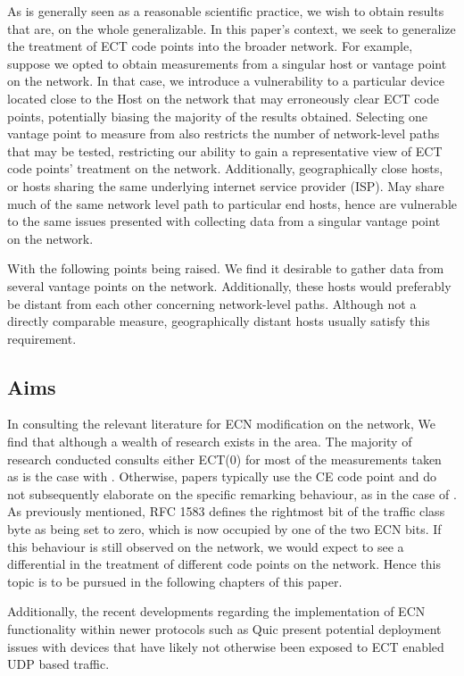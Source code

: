 \documentclass{l4proj}
\begin{document}
As is generally seen as a reasonable scientific practice, we wish to obtain results that are, on the whole generalizable. In this paper's context, we seek to generalize the treatment of ECT code points into the broader network. For example, suppose we opted to obtain measurements from a singular host or vantage point on the network. In that case, we introduce a vulnerability to a particular device located close to the Host on the network that may erroneously clear ECT code points, potentially biasing the majority of the results obtained. Selecting one vantage point to measure from also restricts the number of network-level paths that may be tested, restricting our ability to gain a representative view of ECT code points' treatment on the network. Additionally, geographically close hosts, or hosts sharing the same underlying internet service provider (ISP). May share much of the same network level path to particular end hosts, hence are vulnerable to the same issues presented with collecting data from a singular vantage point on the network. 

With the following points being raised. We find it desirable to gather data from several vantage points on the network. Additionally, these hosts would preferably be distant from each other concerning network-level paths. Although not a directly comparable measure, geographically distant hosts usually satisfy this requirement.

\subsection{Aims}
\label{sec:aims}

In consulting the relevant literature for ECN modification on the network, We find that although a wealth of research exists in the area. The majority of research conducted consults either ECT(0) for most of the measurements taken as is the case with \cite{mcquistin_is_2015}. Otherwise, papers typically use the CE code point and do not subsequently elaborate on the specific remarking behaviour, as in the case of \cite{bauer_measuring_2011}. As previously mentioned, RFC 1583 defines the rightmost bit of the traffic class byte as being set to zero, which is now occupied by one of the two ECN bits\cite{rfc1583}. If this behaviour is still observed on the network, we would expect to see a differential in the treatment of different code points on the network. Hence this topic is to be pursued in the following chapters of this paper. 

Additionally, the recent developments regarding the implementation of ECN functionality within newer protocols such as Quic present potential deployment issues with devices that have likely not otherwise been exposed to ECT enabled UDP based traffic. 
\end{document}
